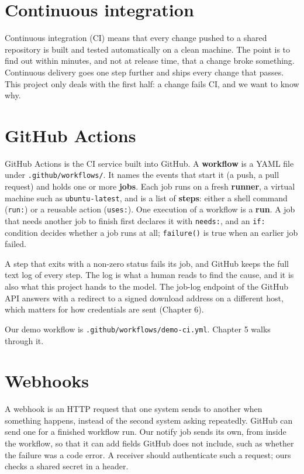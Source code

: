 \documentclass[11pt,a4paper]{report}
\begin{document}
\section{Continuous integration}

Continuous integration (CI) means that every change pushed to a shared repository is built and tested automatically on a clean machine. The point is to find out within minutes, and not at release time, that a change broke something. Continuous delivery goes one step further and ships every change that passes. This project only deals with the first half: a change fails CI, and we want to know why.

\section{GitHub Actions}

GitHub Actions is the CI service built into GitHub. A \textbf{workflow} is a YAML file under \texttt{.\allowbreak{}github/\allowbreak{}workflows/\allowbreak{}}. It names the events that start it (a push, a pull request) and holds one or more \textbf{jobs}. Each job runs on a fresh \textbf{runner}, a virtual machine such as \texttt{ubuntu-\allowbreak{}latest}, and is a list of \textbf{steps}: either a shell command (\texttt{run:}) or a reusable action (\texttt{uses:}). One execution of a workflow is a \textbf{run}. A job that needs another job to finish first declares it with \texttt{needs:}, and an \texttt{if:} condition decides whether a job runs at all; \texttt{failure()} is true when an earlier job failed.

A step that exits with a non-zero status fails its job, and GitHub keeps the full text log of every step. The log is what a human reads to find the cause, and it is also what this project hands to the model. The job-log endpoint of the GitHub API answers with a redirect to a signed download address on a different host, which matters for how credentials are sent (Chapter 6).

Our demo workflow is \texttt{.\allowbreak{}github/\allowbreak{}workflows/\allowbreak{}demo-\allowbreak{}ci.\allowbreak{}yml}. Chapter 5 walks through it.

\section{Webhooks}

A webhook is an HTTP request that one system sends to another when something happens, instead of the second system asking repeatedly. GitHub can send one for a finished workflow run. Our notify job sends its own, from inside the workflow, so that it can add fields GitHub does not include, such as whether the failure was a code error. A receiver should authenticate such a request; ours checks a shared secret in a header.
\end{document}
